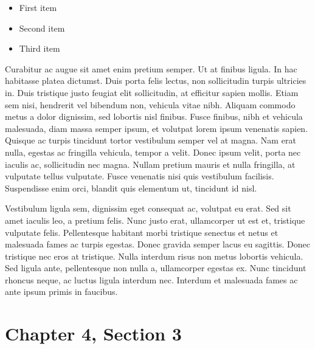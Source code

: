 \begin{itemize}
\color{ForestGreen}
\item First item
\item Second item
\item Third item
\end{itemize}

Curabitur ac augue sit amet enim pretium semper. Ut at finibus ligula. In hac habitasse platea dictumst. Duis porta felis lectus, non sollicitudin turpis ultricies in. Duis tristique justo feugiat elit sollicitudin, at efficitur sapien mollis. Etiam sem nisi, hendrerit vel bibendum non, vehicula vitae nibh. Aliquam commodo metus a dolor dignissim, sed lobortis nisl finibus. Fusce finibus, nibh et vehicula malesuada, diam massa semper ipsum, et volutpat lorem ipsum venenatis sapien. Quisque ac turpis tincidunt tortor vestibulum semper vel at magna. Nam erat nulla, egestas ac fringilla vehicula, tempor a velit. Donec ipsum velit, porta nec iaculis ac, sollicitudin nec magna. Nullam pretium mauris et nulla fringilla, at vulputate tellus vulputate. Fusce venenatis nisi quis vestibulum facilisis. Suspendisse enim orci, blandit quis elementum ut, tincidunt id nisl.

Vestibulum ligula sem, dignissim eget consequat ac, volutpat eu erat. Sed sit amet iaculis leo, a pretium felis. Nunc justo erat, ullamcorper ut est et, tristique vulputate felis. Pellentesque habitant morbi tristique senectus et netus et malesuada fames ac turpis egestas. Donec gravida semper lacus eu sagittis. Donec tristique nec eros at tristique. Nulla interdum risus non metus lobortis vehicula. Sed ligula ante, pellentesque non nulla a, ullamcorper egestas ex. Nunc tincidunt rhoncus neque, ac luctus ligula interdum nec. Interdum et malesuada fames ac ante ipsum primis in faucibus.

\section{Chapter 4, Section 3}

